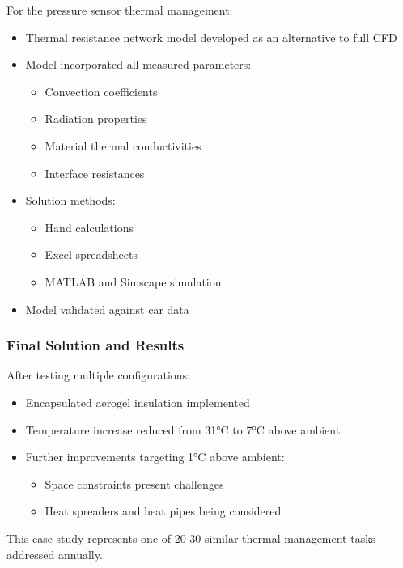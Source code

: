 For the pressure sensor thermal management:
\begin{itemize}
    \item Thermal resistance network model developed as an alternative to full CFD
    \item Model incorporated all measured parameters:
    \begin{itemize}
        \item Convection coefficients
        \item Radiation properties
        \item Material thermal conductivities
        \item Interface resistances
    \end{itemize}
    \item Solution methods:
    \begin{itemize}
        \item Hand calculations
        \item Excel spreadsheets
        \item MATLAB and Simscape simulation
    \end{itemize}
    \item Model validated against car data
\end{itemize}

\subsubsection*{Final Solution and Results}

After testing multiple configurations:
\begin{itemize}
    \item Encapsulated aerogel insulation implemented
    \item Temperature increase reduced from 31°C to 7°C above ambient
    \item Further improvements targeting 1°C above ambient:
    \begin{itemize}
        \item Space constraints present challenges
        \item Heat spreaders and heat pipes being considered
    \end{itemize}
\end{itemize}

This case study represents one of 20-30 similar thermal management tasks addressed annually.

